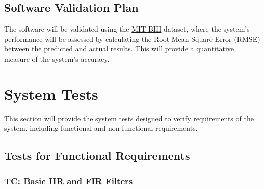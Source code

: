 \documentclass[12pt, titlepage]{article}
\begin{document}
\subsection{Software Validation Plan}

The software will be validated using the
\href{https://www.physionet.org/content/mitdb/1.0.0/}{MIT-BIH} dataset, where
the system's performance will be assessed by calculating the Root Mean Square
Error (RMSE) between the predicted and actual results. This will provide a
quantitative measure of the system's accuracy.

\section{System Tests}


This section will provide the system tests designed to verify requirements of
the system, including functional and non-functional requirements.

\subsection{Tests for Functional Requirements}



 \label{TC_IIR_FIR}
\subsubsection{TC\thetestcasenum : Basic IIR and FIR Filters}
		
\end{document}
